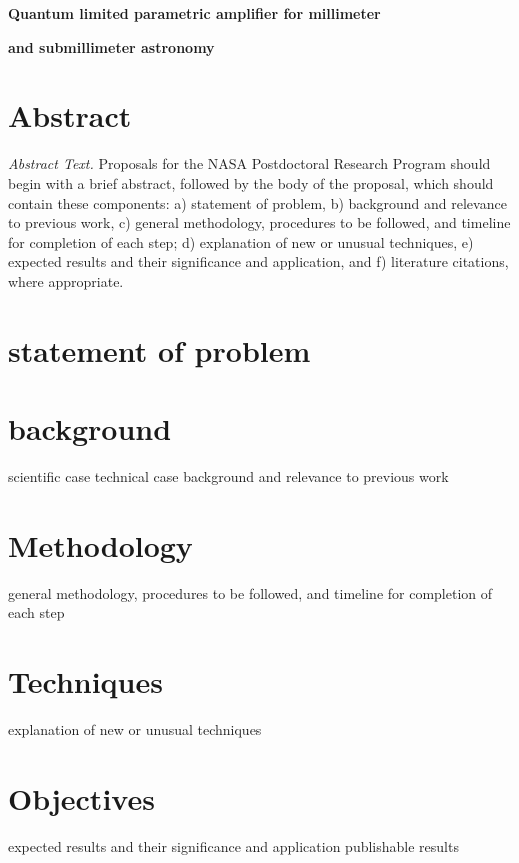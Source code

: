 



\ifpdf
{}
\else
{}
\fi



\centerline{\textbf{Quantum limited parametric amplifier for millimeter}}
\centerline{\textbf{and submillimeter astronomy}}
\section*{Abstract}
\emph{Abstract Text.}
Proposals for the NASA Postdoctoral Research Program should begin with a brief abstract, followed by the body of the proposal, which should contain these components: a) statement of problem, b) background and relevance to previous work, c) general methodology, procedures to be followed, and timeline for completion of each step; d) explanation of new or unusual techniques, e) expected results and their significance and application, and f) literature citations, where appropriate.
\section*{statement of problem}
\section*{background}
scientific case
technical case
background and relevance to previous work
\section*{Methodology}
general methodology, procedures to be followed, and timeline for completion of each step
\section*{Techniques}
explanation of new or unusual techniques
\section*{Objectives}
expected results and their significance and application
publishable results

